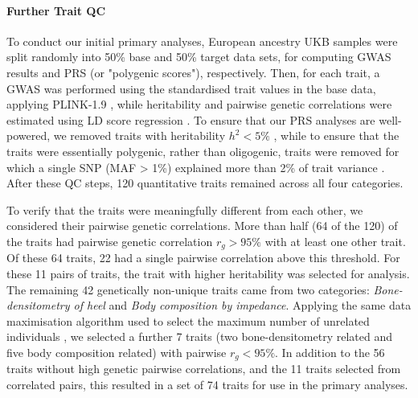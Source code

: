 \documentclass[12pt]{zHenriquesLab-StyleBioRxiv}
\begin{document}
\paragraph*{Further Trait QC}
To conduct our initial primary analyses, European ancestry UKB samples were split 
randomly into 50\% base and 50\% target data sets, for computing GWAS results and 
PRS (or "polygenic scores"), respectively. Then, for each trait, a GWAS was performed 
using the standardised trait values in the base data, applying PLINK-1.9 \cite{plink, bt_10}, 
while heritability and pairwise genetic correlations were estimated using LD score regression \cite{ldsc}.  
To ensure that our PRS analyses are well-powered, we removed traits 
with heritability $h^2<5\%$ \cite{Choi2020}, while to ensure that the traits were 
essentially polygenic, rather than oligogenic, traits were removed for which a single SNP (MAF > 1\%) 
explained more than 2\% of trait variance \cite{2prule}. 
After these QC steps, 120 quantitative traits remained across all four categories. 

To verify that the traits were meaningfully different from each other, we considered their  
pairwise genetic correlations. More than half (64 of the 120) of the traits had pairwise genetic 
correlation $r_g>95\%$ with at least one other trait. Of these 64 traits, 22 had a single pairwise 
correlation above this threshold. For these 11 pairs of traits, the trait with higher heritability 
was selected for analysis.  The remaining 42 genetically non-unique traits came from two 
categories: \textit{ Bone-densitometry of heel}  and \textit{ Body composition by impedance}. Applying the 
same data maximisation algorithm used to select the maximum number of unrelated 
individuals \cite{erase}, we selected a further 7 traits (two bone-densitometry related and five body 
composition related) with pairwise $r_g<95\%$.  In addition to 
the 56 traits without high genetic pairwise correlations, and the 11 traits 
selected from correlated pairs, this resulted in a set of 74 traits for use in the primary analyses. 
\end{document}

